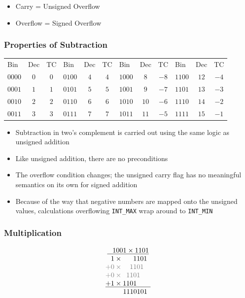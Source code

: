 \documentclass[aspectratio=169]{beamer}
\newif\iftransitions
\begin{document}
\begin{frame}
  \iftransitions \pause \fi
  
  \begin{itemize}
  \item Carry = Unsigned Overflow
  \item Overflow = Signed Overflow
  \end{itemize}
\end{frame}

\begin{frame}
  \frametitle{Properties of Subtraction}
  
  \begin{tabular}{l c c|l c c|l c c|l c c}
  Bin & Dec & TC & Bin & Dec & TC & Bin & Dec & TC & Bin & Dec & TC \\
  $0000$ & $ 0$ & $0$ & $0100$ & $ 4$ & $4$ & $1000$ & $ 8$ & $-8$ & $1100$ & $12$ & $-4$ \\
  $0001$ & $ 1$ & $1$ & $0101$ & $ 5$ & $5$ & $1001$ & $ 9$ & $-7$ & $1101$ & $13$ & $-3$ \\
  $0010$ & $ 2$ & $2$ & $0110$ & $ 6$ & $6$ & $1010$ & $10$ & $-6$ & $1110$ & $14$ & $-2$ \\
  $0011$ & $ 3$ & $3$ & $0111$ & $ 7$ & $7$ & $1011$ & $11$ & $-5$ & $1111$ & $15$ & $-1$ \\
  \end{tabular}
  
  
  \begin{itemize}
  \item Subtraction in two's complement is carried out using the same logic as unsigned addition  \iftransitions \pause \fi 
  \item Like unsigned addition, there are no preconditions  \iftransitions \pause \fi 
  \item The overflow condition changes; the unsigned carry flag has no meaningful semantics on its own for signed addition  \iftransitions \pause \fi 
  \item Because of the way that negative numbers are mapped onto the unsigned values, calculations overflowing \texttt{INT\_MAX} wrap around to \texttt{INT\_MIN}
  \end{itemize}
\end{frame}

\begin{frame}
  \frametitle{Multiplication}
  
  \begin{equation*}\begin{array}{c}
   \underline{\phantom{+}1001 \times 1101}\\
   \phantom{+}1 \times \phantom{999}1101\phantom{9} \\
   \textcolor{gray}{+0 \times \phantom{99}1101\phantom{99}} \\
   \textcolor{gray}{+0 \times \phantom{9}1101\phantom{999}} \\
   \underline{+ 1 \times 1101\phantom{9999}} \\
   \phantom{+ 11 \times }1110101\phantom{9}
  \end{array}\end{equation*}
\end{frame}
\end{document}
